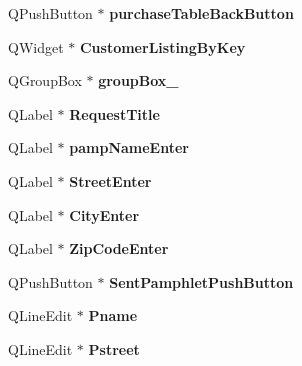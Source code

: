 \begin{DoxyCompactItemize}
Q\+Push\+Button $\ast$ {\bfseries purchase\+Table\+Back\+Button}
\item 
\mbox{\label{class_ui___main_window_a2698a062eaf4a993701ef1f36bb4a566}} 
Q\+Widget $\ast$ {\bfseries Customer\+Listing\+By\+Key}
\item 
\mbox{\label{class_ui___main_window_a3f71b587164e5b20352f1e838e3321cc}} 
Q\+Group\+Box $\ast$ {\bfseries group\+Box\+\_}
\item 
\mbox{\label{class_ui___main_window_a6d8f13f874123722a26bcbdc9a6da747}} 
Q\+Label $\ast$ {\bfseries Request\+Title}
\item 
\mbox{\label{class_ui___main_window_a42b6ae16f2d3fdec63fd7fbda016c0c4}} 
Q\+Label $\ast$ {\bfseries pamp\+Name\+Enter}
\item 
\mbox{\label{class_ui___main_window_ad9090dfb2edbdbf38d5262044e080eb6}} 
Q\+Label $\ast$ {\bfseries Street\+Enter}
\item 
\mbox{\label{class_ui___main_window_a8fcd839667e6eb22adb5bbea3d96d961}} 
Q\+Label $\ast$ {\bfseries City\+Enter}
\item 
\mbox{\label{class_ui___main_window_a39b091da470b5f3531e24bbfe24f7f77}} 
Q\+Label $\ast$ {\bfseries Zip\+Code\+Enter}
\item 
\mbox{\label{class_ui___main_window_aa1af171f28d5042e0747fce73604d0d9}} 
Q\+Push\+Button $\ast$ {\bfseries Sent\+Pamphlet\+Push\+Button}
\item 
\mbox{\label{class_ui___main_window_ac7ab917f0e5a7f7be1a00173b38b6faf}} 
Q\+Line\+Edit $\ast$ {\bfseries Pname}
\item 
\mbox{\label{class_ui___main_window_a85e12cd43a065606f615db65d5a22ebd}} 
Q\+Line\+Edit $\ast$ {\bfseries Pstreet}
\item 
\mbox{\label{class_ui___main_window_a3375e6fc0de0fd5fdc1c778d12efcc49}} 

\end{DoxyCompactItemize}
